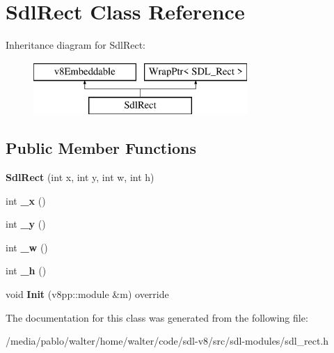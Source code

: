 \hypertarget{classSdlRect}{}\section{Sdl\+Rect Class Reference}
\label{classSdlRect}
Inheritance diagram for Sdl\+Rect\+:\begin{figure}[H]
\begin{center}
\leavevmode
\includegraphics[height=2.000000cm]{classSdlRect}
\end{center}
\end{figure}
\subsection*{Public Member Functions}
\begin{DoxyCompactItemize}
\item 
\mbox{\label{classSdlRect_a6c6961f85e3b8e93c08fe1595b903db1}} 
{\bfseries Sdl\+Rect} (int x, int y, int w, int h)
\item 
\mbox{\label{classSdlRect_a50b3ae7fc02d99d364201c1f5c93b11e}} 
int {\bfseries \+\_\+x} ()
\item 
\mbox{\label{classSdlRect_a68007f2619bb9768c280fd51a85a6e07}} 
int {\bfseries \+\_\+y} ()
\item 
\mbox{\label{classSdlRect_a5585718233526c7d934b33fa7f794901}} 
int {\bfseries \+\_\+w} ()
\item 
\mbox{\label{classSdlRect_ac2842f399896dad3b460860220c39543}} 
int {\bfseries \+\_\+h} ()
\item 
\mbox{\label{classSdlRect_a4137ceeda619a762168793eebbeba50c}} 
void {\bfseries Init} (v8pp\+::module \&m) override
\end{DoxyCompactItemize}


The documentation for this class was generated from the following file\+:\begin{DoxyCompactItemize}
\item 
/media/pablo/walter/home/walter/code/sdl-\/v8/src/sdl-\/modules/sdl\+\_\+rect.\+h\end{DoxyCompactItemize}
